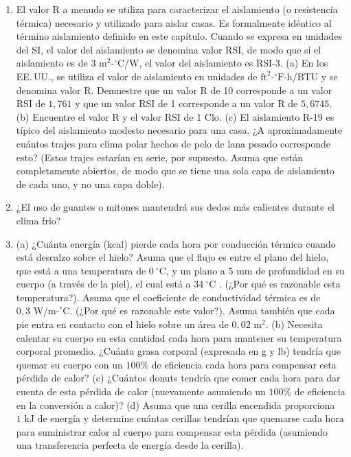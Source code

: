 \documentclass[12pt]{book}
\begin{document}
\begin{enumerate}
\item[6.105] El valor R a menudo se utiliza para caracterizar el aislamiento (o resistencia térmica) necesario y utilizado para aislar casas. Es formalmente idéntico al término aislamiento definido en este capítulo. Cuando se expresa en unidades del SI, el valor del aislamiento se denomina valor RSI, de modo que si el aislamiento es de $3\text{ m}^2\text{-}^\circ\text{C/W}$, el valor del aislamiento es RSI-3. (a) En los EE.\,UU., se utiliza el valor de aislamiento en unidades de $\text{ft}^2\text{-}^\circ\text{F-h/BTU}$ y se denomina valor R. Demuestre que un valor R de 10 corresponde a un valor RSI de $1{,}761$ y que un valor RSI de 1 corresponde a un valor R de $5{,}6745$. (b) Encuentre el valor R y el valor RSI de 1 Clo. (c) El aislamiento R-19 es típico del aislamiento modesto necesario para una casa. ¿A aproximadamente cuántos trajes para clima polar hechos de pelo de lana pesado corresponde esto? (Estos trajes estarían en serie, por supuesto. Asuma que están completamente abiertos, de modo que se tiene una sola capa de aislamiento de cada uno, y no una capa doble).

\item[6.106] ¿El uso de guantes o mitones mantendrá sus dedos más calientes durante el clima frío?

\item[6.107] (a) ¿Cuánta energía (kcal) pierde cada hora por conducción térmica cuando está descalzo sobre el hielo? Asuma que el flujo es entre el plano del hielo, que está a una temperatura de $0\ ^\circ\text{C}$, y un plano a $5\text{ mm}$ de profundidad en su cuerpo (a través de la piel), el cual está a $34\ ^\circ\text{C}$ \cite{2,69}. (¿Por qué es razonable esta temperatura?). Asuma que el coeficiente de conductividad térmica es de $0{,}3\text{ W/m-}^\circ\text{C}$. (¿Por qué es razonable este valor?). Asuma también que cada pie entra en contacto con el hielo sobre un área de $0{,}02\text{ m}^2$. (b) Necesita calentar su cuerpo en esta cantidad cada hora para mantener su temperatura corporal promedio. ¿Cuánta grasa corporal (expresada en g y lb) tendría que quemar su cuerpo con un $100\%$ de eficiencia cada hora para compensar esta pérdida de calor? (c) ¿Cuántos donuts tendría que comer cada hora para dar cuenta de esta pérdida de calor (nuevamente asumiendo un $100\%$ de eficiencia en la conversión a calor)? (d) Asuma que una cerilla encendida proporciona $1\text{ kJ}$ de energía y determine cuántas cerillas tendrían que quemarse cada hora para suministrar calor al cuerpo para compensar esta pérdida (asumiendo una transferencia perfecta de energía desde la cerilla).


\end{enumerate}
\end{document}
